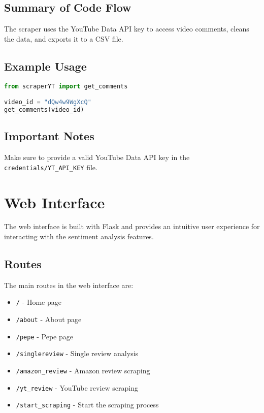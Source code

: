 \documentclass[a4paper]{article}
\begin{document}
\subsection{Summary of Code Flow}
The scraper uses the YouTube Data API key to access video comments, cleans the data, and exports it to a CSV file.

\subsection{Example Usage}
\begin{lstlisting}[language=python]
from scraperYT import get_comments

video_id = "dQw4w9WgXcQ"
get_comments(video_id)
\end{lstlisting}

\subsection{Important Notes}
Make sure to provide a valid YouTube Data API key in the \texttt{credentials/YT\_API\_KEY} file.

\section{Web Interface}
The web interface is built with Flask and provides an intuitive user experience for interacting with the sentiment analysis features.

\subsection{Routes}
The main routes in the web interface are:
\begin{itemize}
    \item \texttt{/} - Home page
    \item \texttt{/about} - About page
    \item \texttt{/pepe} - Pepe page
    \item \texttt{/singlereview} - Single review analysis
    \item \texttt{/amazon\_review} - Amazon review scraping
    \item \texttt{/yt\_review} - YouTube review scraping
    \item \texttt{/start\_scraping} - Start the scraping process
\end{itemize}
\end{document}
